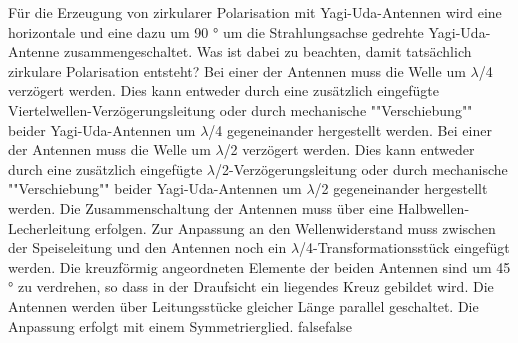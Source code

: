     {Für die Erzeugung von zirkularer Polarisation mit Yagi-Uda-Antennen wird eine horizontale und eine dazu um 90 ° um die Strahlungsachse gedrehte Yagi-Uda-Antenne zusammengeschaltet. Was ist dabei zu beachten, damit tatsächlich zirkulare Polarisation entsteht?}
    {Bei einer der Antennen muss die Welle um $\lambda$/4 verzögert werden. Dies kann entweder durch eine zusätzlich eingefügte Viertelwellen-Verzögerungsleitung oder durch mechanische ""Verschiebung"" beider Yagi-Uda-Antennen um $\lambda$/4 gegeneinander hergestellt werden.}
    {Bei einer der Antennen muss die Welle um $\lambda$/2 verzögert werden. Dies kann entweder durch eine zusätzlich eingefügte $\lambda$/2-Verzögerungsleitung oder durch mechanische ""Verschiebung"" beider Yagi-Uda-Antennen um $\lambda$/2 gegeneinander hergestellt werden.}
    {Die Zusammenschaltung der Antennen muss über eine Halbwellen-Lecherleitung erfolgen. Zur Anpassung an den Wellenwiderstand muss zwischen der Speiseleitung und den Antennen noch ein $\lambda$/4-Transformationsstück eingefügt werden.}
    {Die kreuzförmig angeordneten Elemente der beiden Antennen sind um 45 ° zu verdrehen, so dass in der Draufsicht ein liegendes Kreuz gebildet wird. Die Antennen werden über Leitungsstücke gleicher Länge parallel geschaltet. Die Anpassung erfolgt mit einem Symmetrierglied.}
    {false}{false}